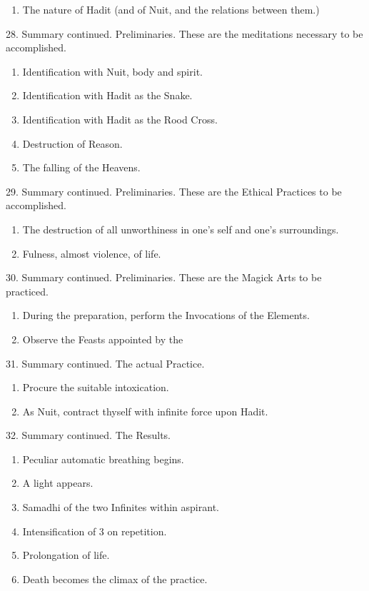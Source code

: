 \begin{enumerate}[leftmargin=4\parindent]
\item The nature of Hadit (and of Nuit, and the relations between them.)
\end{enumerate}

28. Summary continued. Preliminaries. These are the meditations necessary to be accomplished.

\begin{enumerate}[leftmargin=4\parindent]

\item Identification with Nuit, body and spirit.
\item Identification with Hadit as the Snake.
\item Identification with Hadit as the Rood Cross.
\item Destruction of Reason.
\item The falling of the Heavens.
\end{enumerate}

29. Summary continued. Preliminaries. These are the Ethical Practices to be accomplished.
\begin{enumerate}[leftmargin=4\parindent]
\item The destruction of all unworthiness in one's self and one's surroundings.
\item Fulness, almost violence, of life.
\end{enumerate}

30. Summary continued. Preliminaries. These are the Magick Arts to be practiced.
\begin{enumerate}[leftmargin=4\parindent]
\item During the preparation, perform the Invocations of the Elements.
\item Observe the Feasts appointed by the \Argentium{}
\end{enumerate}

31. Summary continued. The actual Practice.

\begin{enumerate}[leftmargin=4\parindent]
\item Procure the suitable intoxication.
\item As Nuit, contract thyself with infinite force upon Hadit.
\end{enumerate}

32. Summary continued. The Results.
\begin{enumerate}[leftmargin=4\parindent]
\item Peculiar automatic breathing begins.
\item A light appears.
\item Samadhi of the two Infinites within aspirant.
\item Intensification of 3 on repetition.
\item Prolongation of life.
\item Death becomes the climax of the practice.
\end{enumerate}

